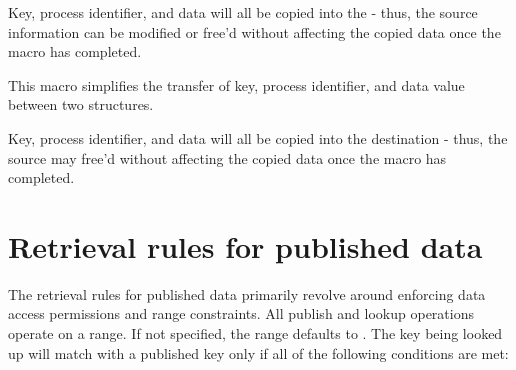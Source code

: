 \adviceuserstart
Key, process identifier, and data will all be copied into the  - thus, the source information can be modified or free'd without affecting the copied data once the macro has completed.
\adviceuserend


This macro simplifies the transfer of key, process identifier, and data value between two structures.


\begin{arglist}
\end{arglist}

\adviceuserstart
Key, process identifier, and data will all be copied into the destination  - thus, the source  may free'd without affecting the copied data once the macro has completed.
\adviceuserend

\section{Retrieval rules for published data}
\label{chap:pub:retrules}

The retrieval rules for published data primarily revolve around enforcing data access permissions and range constraints.
All publish and lookup operations operate on a range. If not specified, the range defaults to .
The key being looked up will match with a published key only if all of the following conditions are met:

